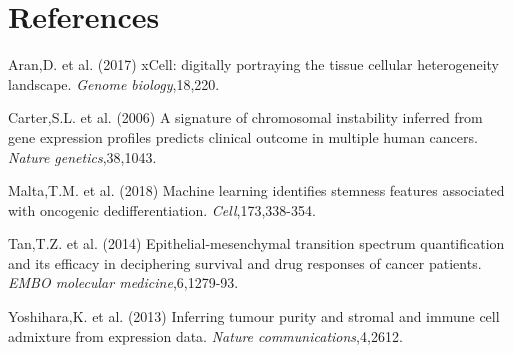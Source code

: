\documentclass{article}\usepackage[]{graphicx}\usepackage[]{color}
\begin{document}
\section{References}
\begin{description}
\item Aran,D. et al. (2017) xCell: digitally portraying the tissue cellular heterogeneity landscape. \emph{Genome biology},18,220.
\item Carter,S.L. et al. (2006) A signature of chromosomal instability inferred from gene expression profiles predicts clinical outcome in multiple human cancers. \textit{Nature genetics},38,1043.
\item Malta,T.M. et al. (2018) Machine learning identifies stemness features associated with oncogenic dedifferentiation. \textit{Cell},173,338-354.
\item Tan,T.Z. et al. (2014) Epithelial-mesenchymal transition spectrum quantification and its efficacy in deciphering survival and drug responses of cancer patients. \textit{EMBO molecular medicine},6,1279-93.
\item Yoshihara,K. et al. (2013) Inferring tumour purity and stromal and immune cell admixture from expression data. \textit{Nature communications},4,2612.

\end{description}
\end{document}
